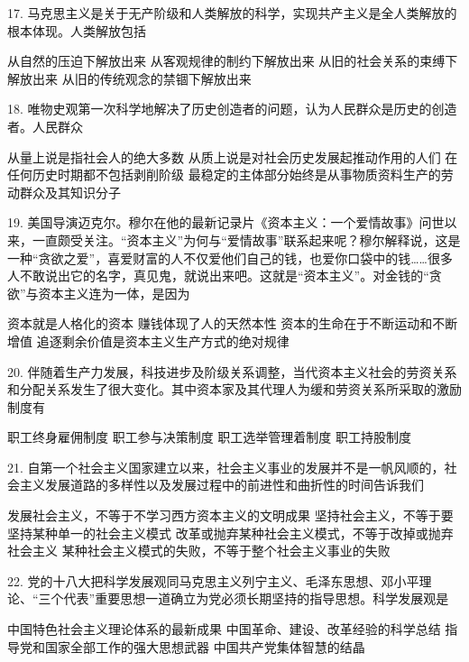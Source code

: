 17. 马克思主义是关于无产阶级和人类解放的科学，实现共产主义是全人类解放的根本体现。人类解放包括
\begin{choices}
	 从自然的压迫下解放出来
	 从客观规律的制约下解放出来
	 从旧的社会关系的束缚下解放出来
	 从旧的传统观念的禁锢下解放出来
\end{choices}
18. 唯物史观第一次科学地解决了历史创造者的问题，认为人民群众是历史的创造者。人民群众
\begin{choices}
	 从量上说是指社会人的绝大多数
	 从质上说是对社会历史发展起推动作用的人们
	 在任何历史时期都不包括剥削阶级
	 最稳定的主体部分始终是从事物质资料生产的劳动群众及其知识分子
\end{choices}
19. 美国导演迈克尔。穆尔在他的最新记录片《资本主义：一个爱情故事》问世以来，一直颇受关注。“资本主义”为何与“爱情故事”联系起来呢？穆尔解释说，这是一种“贪欲之爱”，喜爱财富的人不仅爱他们自己的钱，也爱你口袋中的钱……很多人不敢说出它的名字，真见鬼，就说出来吧。这就是“资本主义”。对金钱的“贪欲”与资本主义连为一体，是因为
\begin{choices}
	 资本就是人格化的资本
	 赚钱体现了人的天然本性
	 资本的生命在于不断运动和不断增值
	 追逐剩余价值是资本主义生产方式的绝对规律
\end{choices}
20. 伴随着生产力发展，科技进步及阶级关系调整，当代资本主义社会的劳资关系和分配关系发生了很大变化。其中资本家及其代理人为缓和劳资关系所采取的激励制度有
\begin{choices}
	 职工终身雇佣制度
	 职工参与决策制度
	 职工选举管理着制度
	 职工持股制度
\end{choices}
21. 自第一个社会主义国家建立以来，社会主义事业的发展并不是一帆风顺的，社会主义发展道路的多样性以及发展过程中的前进性和曲折性的时间告诉我们
\begin{choices}
	 发展社会主义，不等于不学习西方资本主义的文明成果
	 坚持社会主义，不等于要坚持某种单一的社会主义模式
	 改革或抛弃某种社会主义模式，不等于改掉或抛弃社会主义
	 某种社会主义模式的失败，不等于整个社会主义事业的失败
\end{choices}
22. 党的十八大把科学发展观同马克思主义列宁主义、毛泽东思想、邓小平理论、“三个代表”重要思想一道确立为党必须长期坚持的指导思想。科学发展观是
\begin{choices}
	 中国特色社会主义理论体系的最新成果
	 中国革命、建设、改革经验的科学总结
	 指导党和国家全部工作的强大思想武器
	 中国共产党集体智慧的结晶
\end{choices}
